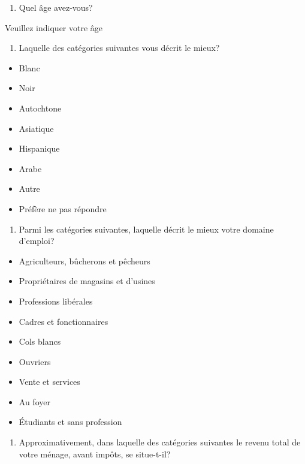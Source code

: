\documentclass[
  letterpaper,
  DIV=11,
  numbers=noendperiod]{scrreprt}
\providecommand{\tightlist}{%
  \setlength{\itemsep}{0pt}\setlength{\parskip}{0pt}}\usepackage{longtable,booktabs,array}
\begin{document}
\begin{enumerate}
\def\labelenumi{\arabic{enumi}.}
\setcounter{enumi}{2}
\tightlist
\item
  Quel âge avez-vous?
\end{enumerate}

Veuillez indiquer votre âge

\begin{enumerate}
\def\labelenumi{\arabic{enumi}.}
\setcounter{enumi}{3}
\tightlist
\item
  Laquelle des catégories suivantes vous décrit le mieux?
\end{enumerate}

\begin{itemize}
\tightlist
\item
  Blanc
\item
  Noir
\item
  Autochtone
\item
  Asiatique
\item
  Hispanique
\item
  Arabe
\item
  Autre
\item
  Préfère ne pas répondre
\end{itemize}

\begin{enumerate}
\def\labelenumi{\arabic{enumi}.}
\setcounter{enumi}{4}
\tightlist
\item
  Parmi les catégories suivantes, laquelle décrit le mieux votre domaine
  d'emploi?
\end{enumerate}

\begin{itemize}
\tightlist
\item
  Agriculteurs, bûcherons et pêcheurs
\item
  Propriétaires de magasins et d'usines
\item
  Professions libérales
\item
  Cadres et fonctionnaires
\item
  Cols blancs
\item
  Ouvriers
\item
  Vente et services
\item
  Au foyer
\item
  Étudiants et sans profession
\end{itemize}

\begin{enumerate}
\def\labelenumi{\arabic{enumi}.}
\setcounter{enumi}{5}
\tightlist
\item
  Approximativement, dans laquelle des catégories suivantes le revenu
  total de votre ménage, avant impôts, se situe-t-il?
\end{enumerate}
\end{document}
